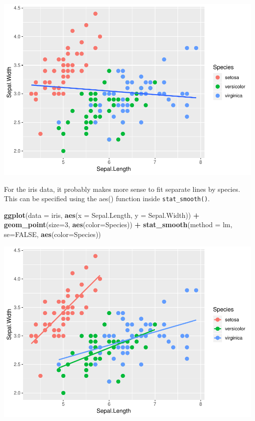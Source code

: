 \documentclass[]{article}
\newenvironment{Shaded}{\begin{snugshade}}{\end{snugshade}}
\newcommand{\KeywordTok}[1]{\textcolor[rgb]{0.13,0.29,0.53}{\textbf{#1}}}
\newcommand{\DataTypeTok}[1]{\textcolor[rgb]{0.13,0.29,0.53}{#1}}
\newcommand{\DecValTok}[1]{\textcolor[rgb]{0.00,0.00,0.81}{#1}}
\newcommand{\StringTok}[1]{\textcolor[rgb]{0.31,0.60,0.02}{#1}}
\newcommand{\OtherTok}[1]{\textcolor[rgb]{0.56,0.35,0.01}{#1}}
\newcommand{\OperatorTok}[1]{\textcolor[rgb]{0.81,0.36,0.00}{\textbf{#1}}}
\newcommand{\NormalTok}[1]{#1}
\begin{document}
\includegraphics{stt-301-programming_files/figure-latex/unnamed-chunk-59-1.pdf}

For the iris data, it probably makes more sense to fit separate lines by
species. This can be specified using the aes() function inside
\texttt{stat\_smooth()}.

\begin{Shaded}
\begin{Highlighting}[]
\KeywordTok{ggplot}\NormalTok{(}\DataTypeTok{data =}\NormalTok{ iris, }\KeywordTok{aes}\NormalTok{(}\DataTypeTok{x =}\NormalTok{ Sepal.Length, }\DataTypeTok{y =}\NormalTok{ Sepal.Width)) }\OperatorTok{+}
\StringTok{      }\KeywordTok{geom_point}\NormalTok{(}\DataTypeTok{size=}\DecValTok{3}\NormalTok{, }\KeywordTok{aes}\NormalTok{(}\DataTypeTok{color=}\NormalTok{Species)) }\OperatorTok{+}
\StringTok{      }\KeywordTok{stat_smooth}\NormalTok{(}\DataTypeTok{method =}\NormalTok{ lm, }\DataTypeTok{se=}\OtherTok{FALSE}\NormalTok{, }\KeywordTok{aes}\NormalTok{(}\DataTypeTok{color=}\NormalTok{Species))}
\end{Highlighting}
\end{Shaded}

\includegraphics{stt-301-programming_files/figure-latex/unnamed-chunk-60-1.pdf}
\end{document}
